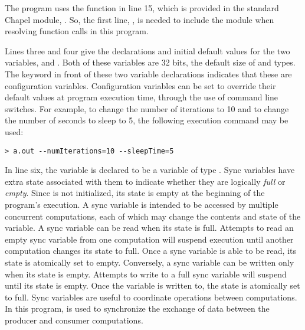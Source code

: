 The program uses the  function in line 15, which is provided in the
standard Chapel module, .  So, the first line, , 
is needed to include the  module when resolving 
function calls in this program.  

Lines three and four give the declarations and initial default values
for the two variables,  and .
Both of these variables are 32 bits, the default size of  and  types.
The  keyword in front of these two variable declarations 
indicates that these are configuration variables.  Configuration variables 
can be set to override their default values at program execution time, through the 
use of command line switches.  For example, to change the number of iterations to 10
and to change the number of seconds to sleep to 5, the following execution command 
may be used:
\begin{verbatim}
> a.out --numIterations=10 --sleepTime=5
\end{verbatim}

In line six, the variable  is declared to be a  variable 
of type .  Sync variables have extra state associated with them to 
indicate whether they are logically {\em full} or {\em empty}.  Since 
is not initialized, its state is empty at the beginning of the program's execution.
A sync variable
is intended to be accessed by multiple concurrent computations, each of which may
change the contents and state of the variable.  A sync variable
can be read when its state is full.  Attempts to read an empty sync variable from one
computation will suspend execution until another computation changes its state to full.  
Once a sync variable is able to be read, its state is atomically set to empty.  
Conversely, a sync variable can be written only when its state is empty.  Attempts
to write to a full sync variable will suspend until its state is empty.  Once the variable
is written to, the state is atomically set to full.  Sync variables are useful
to coordinate operations between computations.  In this program,  is used
to synchronize the exchange of data between the producer and consumer computations.

